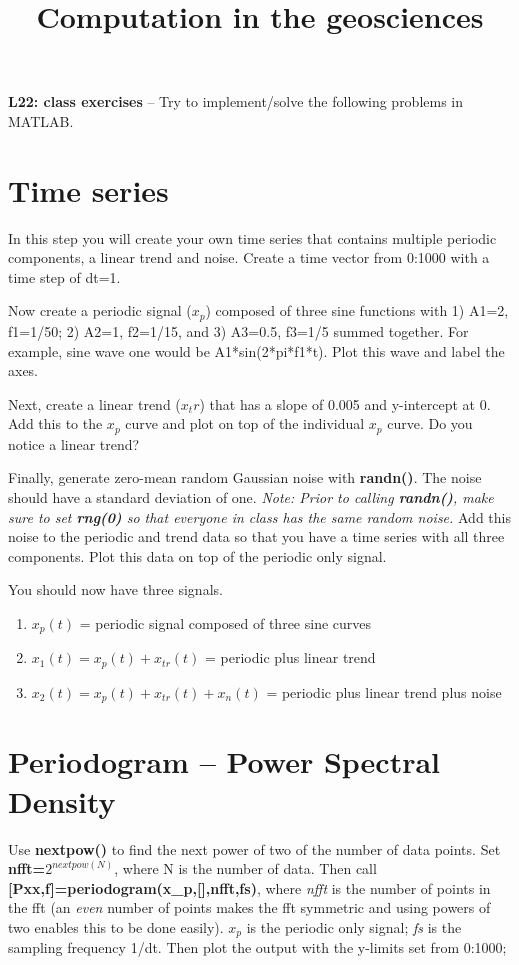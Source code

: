 \documentclass[10pt,fleqn]{article}
\title{Computation in the geosciences}
\date{\empty}
\begin{document}
\textbf{L22: class exercises} -- Try to implement/solve the following problems in MATLAB.

\section*{Time series}

In this step you will create your own time series that contains multiple periodic components, a linear trend and noise. Create a time vector from 0:1000 with a time step of dt=1.

Now create a periodic signal ($x_p$) composed of three sine functions with 1) A1=2, f1=1/50; 2) A2=1, f2=1/15, and 3) A3=0.5, f3=1/5 summed together. For example, sine wave one would be A1*sin(2*pi*f1*t). Plot this wave and label the axes.

Next, create a linear trend ($x_tr$) that has a slope of 0.005 and y-intercept at 0. Add this to the $x_p$ curve and plot on top of the individual $x_p$ curve. Do you notice a linear trend?

Finally, generate zero-mean random Gaussian noise with \textbf{randn()}. The noise should have a standard deviation of one. \textit{Note: Prior to calling \textbf{randn()}, make sure to set \textbf{rng(0)} so that everyone in class has the same random noise.} Add this noise to the periodic and trend data so that you have a time series with all three components. Plot this data on top of the periodic only signal.

You should now have three signals.
\begin{enumerate}
  \item $x_p(t)$ = periodic signal composed of three sine curves
  \item $x_1(t) = x_p(t) + x_{tr}(t)$ = periodic plus linear trend
  \item $x_2(t) = x_p(t) + x_{tr}(t) + x_n(t)$ = periodic plus linear trend plus noise
\end{enumerate}

\section{Periodogram -- Power Spectral Density}

Use \textbf{nextpow()} to find the next power of two of the number of data points. Set \textbf{nfft=$2^{nextpow(N)}$}, where N is the number of data. Then call \textbf{[Pxx,f]=periodogram(x\_p,[],nfft,fs)}, where \textit{nfft} is the number of points in the fft (an \textit{even} number of points makes the fft symmetric and using powers of two enables this to be done easily). $x_p$ is the periodic only signal; \textit{fs} is the sampling frequency 1/dt. Then plot the output with the y-limits set from 0:1000;
\end{document}
